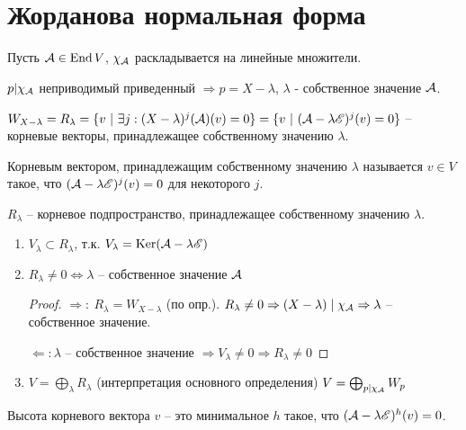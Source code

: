 \documentclass[main]{subfiles}
\begin{document}
\chapter{Жорданова нормальная форма}

Пусть $\mathcal{A} \in \operatorname{End} V$, $\chi_{\mathcal{A}}$ раскладывается на линейные множители.

$p| \chi_{\mathcal{A}}$ неприводимый приведенный $\Rightarrow p = X - \lambda$, $\lambda$ - собственное значение $\mathcal{A}$.

$W_{X-\lambda} = R_{\lambda} = \{v \ | \ \exists j:(X-\lambda)^j (\mca) (v) = 0\} =
  \{v \ | \ (\mca - \lambda \mse )^j (v) = 0\}$ -- корневые векторы, принадлежащее собственному значению $\lambda$.

\begin{definition} 
  Корневым вектором, принадлежащим собственному значению $\lambda$ называется $v \in V$ такое, что $(\mathcal{A} - \lambda \mathscr{E})^j (v) = 0$ для некоторого $j$.

  $R_{\lambda}$ -- корневое подпространство, принадлежащее собственному значению $\lambda$.
\end{definition}

\begin{propertylist}
  \begin{enumerate}
    \item $V_{\lambda} \subset R_{\lambda}$, т.к. $V_{\lambda} = \operatorname{Ker}(\mathcal{A} - \lambda \mathscr{E})$
    \item $R_{\lambda} \neq 0 \Leftrightarrow \lambda$ -- собственное значение $\mathcal{A}$
          \begin{proof}
            $\Rightarrow: \ R_{\lambda} = W_{X-\lambda}$ (по опр.). $R_{\lambda} \neq 0 \Rightarrow
              (X - \lambda) \mid \chi_{\mathcal{A}} \Rightarrow \lambda$ -- собственное значение.

            $\Leftarrow: \lambda$ -- собственное значение $\Rightarrow V_{\lambda} \neq 0 \Rightarrow R_{\lambda} \neq 0$
          \end{proof}
    \item $V = \bigoplus_{\lambda} R_{\lambda}$ (интерпретация основного определения) $V = \bigoplus_{p | \chi_{\mathcal{A}}} W_p$
  \end{enumerate}
\end{propertylist}

\begin{definition} 
  Высота корневого вектора $v$ -- это минимальное $h$ такое, что $(\mathcal{A} - \lambda \mathscr{E})^h (v) = 0$.
\end{definition}
\end{document}
